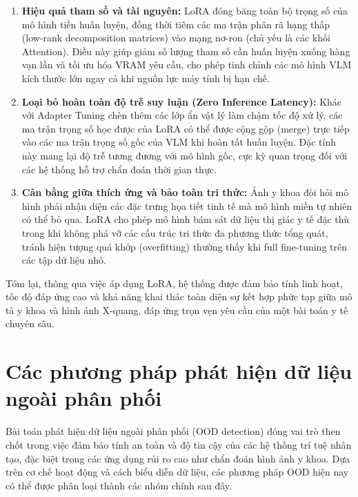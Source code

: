 \begin{enumerate}
    \item \textbf{Hiệu quả tham số và tài nguyên:} LoRA đóng băng toàn bộ trọng số của mô hình tiền huấn luyện, đồng thời tiêm các ma trận phân rã hạng thấp (low-rank decomposition matrices) vào mạng nơ-ron (chủ yếu là các khối Attention). Điều này giúp giảm số lượng tham số cần huấn luyện xuống hàng vạn lần và tối ưu hóa VRAM yêu cầu, cho phép tinh chỉnh các mô hình VLM kích thước lớn ngay cả khi nguồn lực máy tính bị hạn chế.
    \item \textbf{Loại bỏ hoàn toàn độ trễ suy luận (Zero Inference Latency):} Khác với Adapter Tuning chèn thêm các lớp ẩn vật lý làm chậm tốc độ xử lý, các ma trận trọng số học được của LoRA có thể được cộng gộp (merge) trực tiếp vào các ma trận trọng số gốc của VLM khi hoàn tất huấn luyện. Đặc tính này mang lại độ trễ tương đương với mô hình gốc, cực kỳ quan trọng đối với các hệ thống hỗ trợ chẩn đoán thời gian thực.
    \item \textbf{Cân bằng giữa thích ứng và bảo toàn tri thức:} Ảnh y khoa đòi hỏi mô hình phải nhận diện các đặc trưng họa tiết tinh tế mà mô hình miền tự nhiên có thể bỏ qua. LoRA cho phép mô hình bám sát dữ liệu thị giác y tế đặc thù trong khi không phá vỡ các cấu trúc tri thức đa phương thức tổng quát, tránh hiện tượng quá khớp (overfitting) thường thấy khi full fine-tuning trên các tập dữ liệu nhỏ.
\end{enumerate}
Tóm lại, thông qua việc áp dụng LoRA, hệ thống được đảm bảo tính linh hoạt, tốc độ đáp ứng cao và khả năng khai thác toàn diện sự kết hợp phức tạp giữa mô tả y khoa và hình ảnh X-quang, đáp ứng trọn vẹn yêu cầu của một bài toán y tế chuyên sâu.  
 
\section{Các phương pháp phát hiện dữ liệu ngoài phân phối}
Bài toán phát hiện dữ liệu ngoài phân phối (OOD detection) đóng vai trò then chốt trong việc đảm bảo tính an toàn 
và độ tin cậy của các hệ thống trí tuệ nhân tạo, đặc biệt trong các ứng dụng rủi ro cao như chẩn đoán hình ảnh y khoa. 
Dựa trên cơ chế hoạt động và cách biểu diễn dữ liệu, các phương pháp OOD hiện nay có thể được phân loại thành các nhóm chính sau đây.
